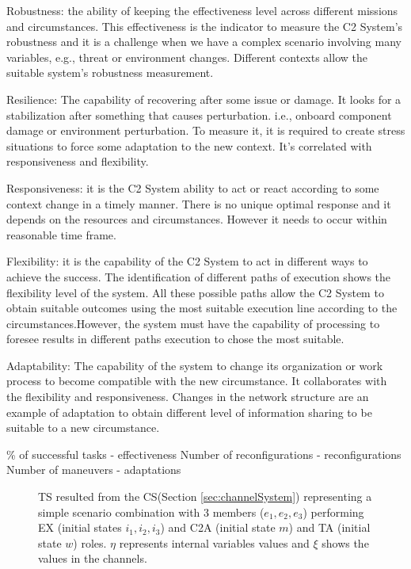Robustness: the ability of keeping the effectiveness level across different missions and circumstances. This effectiveness is the indicator to measure the C2 System's robustness and it is a challenge when we have a complex scenario involving many variables, e.g., threat or environment changes. Different contexts allow the suitable system's robustness measurement.

Resilience: The capability of recovering after some issue or damage. It looks for a stabilization after something that causes perturbation. i.e., onboard component damage or environment perturbation. To measure it, it is required to create stress situations to force some adaptation to the new context. It's correlated with responsiveness and flexibility.

Responsiveness: it is the C2 System ability to act or react according to some context change in a timely manner. There is no unique optimal response and it depends on the resources and circumstances. However it needs to occur within reasonable time frame.

Flexibility: it is the capability of the C2 System to act in different ways to achieve the success. The identification of different paths of execution shows the flexibility level of the system. All these possible paths allow the C2 System to obtain suitable outcomes using the most suitable execution line according to the circumstances.However, the system must have the capability of processing to foresee results in different paths execution to chose the most suitable.

Adaptability: The capability of the system to change its organization or work process to become compatible with the new circumstance. It collaborates with the flexibility and responsiveness. Changes in the network structure are an example of adaptation to obtain different level of information sharing to be suitable to a new circumstance.

\% of successful tasks - effectiveness
Number of reconfigurations - reconfigurations
Number of maneuvers - adaptations


\begin{figure}[H]
    \centering
    \scalebox{.5}{}
    \caption{TS resulted from the CS(Section \ref{sec:channelSystem}) representing a simple scenario combination with 3 members ($e_1, e_2, e_3$) performing EX (initial states $i_1, i_2, i_3$) and C2A (initial state $m$) and TA (initial state $w$) roles. $\eta$ represents internal variables values and $\xi$ shows the values in the channels.}
    \label{fig:TS}
\end{figure}


